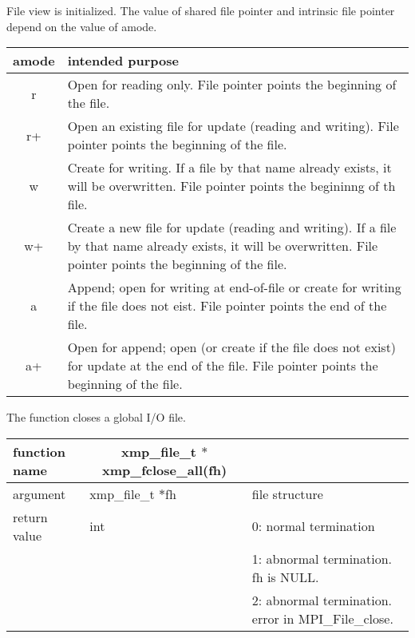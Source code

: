    File view is initialized. The value of shared file pointer and intrinsic file
   pointer depend on the value of amode.

      \begin{table}[h]
   \begin{center}
    \label{tb:xxx}
    \begin{tabular}{c|p{100mm}}
     amode & intended purpose \\ \hline
     r &  Open for reading only. File pointer points the beginning of
	 the file.\\
     r+ & Open an existing file for update (reading and writing). File
	 pointer points the beginning of the file. \\
     w &  Create for writing. If a file by that name already exists, it
	 will be overwritten. File pointer points the begininng of th file. \\
     w+ & Create a new file for update (reading and writing). If a file
	 by that name already exists, it will be overwritten. File
	 pointer points the beginning of the file. \\
     a & Append; open for writing at end-of-file or create for writing
	 if the file does not eist. File pointer points the end of the file. \\
     a+ & Open for append; open (or create if the file does not exist)
	 for update at the end of the file. File pointer points the
	 beginning of the file. \\
    \end{tabular}
   \end{center}
   \end{table}


   \clearpage
   [CLOSE]

   The function closes a global I/O file.

   \begin{table}[h]
    \begin{center}
     \begin{tabular}{l|l|p{70mm}}
      \hline
      {\bf function name}  & \multicolumn{1}{c}{\bf xmp\_file\_t
      $*$xmp\_fclose\_all(fh)} &  \\
      \hline
      argument & xmp\_file\_t $*$fh & file structure \\
      \hline
      return value & int & 0: normal termination \\
      &  & 1: abnormal termination. fh is NULL. \\
      &  & 2: abnormal termination. error in MPI\_File\_close. \\ \hline
      \end{tabular}
     \end{center}
    \label{tb:close}
   \end{table}
   
